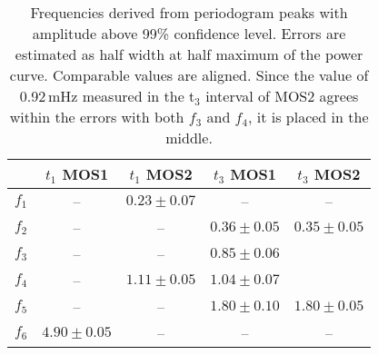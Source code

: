 \documentclass{aa}
\begin{document}
\newcommand*{\movedown}[1]{%
  \smash{\raisebox{-1.5ex}{#1}}}
\begin{table}
\caption{Frequencies derived from periodogram peaks with amplitude above
99\% confidence level. Errors are estimated as half width at half maximum
of the power curve. Comparable values are aligned. Since the value of
0.92\,mHz measured in the t$_3$ interval of MOS2 agrees within the errors
with both $f_3$ and $f_4$, it is placed in the middle.}
\begin{center}
\begin{tabular}{lcccc}
\hline
\hline
& $t_1$ MOS1 & $t_1$ MOS2 & $t_3$ MOS1 & $t_3$ MOS2\\
\hline
$f_1$ & -- &$0.23 \pm 0.07$ & -- & --\\
$f_2$ & -- & -- & $0.36 \pm 0.05$ & $0.35 \pm 0.05$\\
$f_3$ & -- & -- & $0.85 \pm 0.06$ & \movedown{$0.92 \pm 0.09$}\\
$f_4$ & -- & $1.11 \pm 0.05$ & $1.04 \pm 0.07$ &\\
$f_5$ & -- & -- & $1.80 \pm 0.10$ & $1.80 \pm 0.05$\\
$f_6$ & $4.90 \pm 0.05$ & --& -- & --\\
\hline
\end{tabular}
\end{center}
\label{tab:periods}
\end{table}
\end{document}
